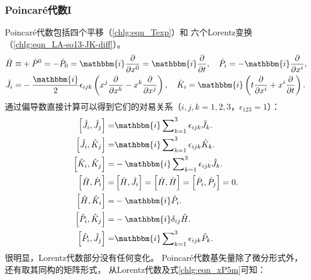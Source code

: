 \subsubsection{Poincar\'{e}代数I}\label{chlg:sec_PA-1}
Poincar\'{e}代数包括四个平移（\eqref{chlg:eqn_Texp}）和
六个Lorentz变换（\eqref{chlg:eqn_LA-so13-JK-diff}）。
\begin{subequations}\label{chlg:eqn_PA-gen}
    \begin{align}
        \hat{H} \equiv& +\hat{P}^0= -\hat{P}_0 = \mathbbm{i}\frac{\partial }{\partial x^0}
        = \mathbbm{i}\frac{\partial }{\partial t }, \quad
        \hat{P}_i = -\mathbbm{i}\frac{\partial }{\partial x^i} ,\\
        \hat{J}_i=& -\frac{\mathbbm{i}}{2}\epsilon_{ijk} \left(x^j\frac{\partial }{\partial x^k}
        - x^k\frac{\partial }{\partial x^j}\right), \quad
        \hat{K}_i= \mathbbm{i} \left(t\frac{\partial }{\partial x^i}+  x^i\frac{\partial }{\partial t}\right) .
    \end{align}
\end{subequations}
通过偏导数直接计算可以得到它们的对易关系（$i,j,k=1,2,3$，$\epsilon_{123}=1$）：
\begin{subequations}\label{chlg:eqn_PA-iso13-comm-PJK}
    \begin{align}
        \left[\hat{J}_i, \hat{J}_j \right] =& \mathbbm{i} \sum\nolimits_{k=1}^{3} \epsilon_{ijk} \hat{J}_k . \\
        \left[\hat{J}_i, \hat{K}_j\right] =& \mathbbm{i} \sum\nolimits_{k=1}^{3} \epsilon_{ijk} \hat{K}_k . \\
        \left[\hat{K}_i, \hat{K}_j\right] =& -\mathbbm{i}\sum\nolimits_{k=1}^{3} \epsilon_{ijk} \hat{J}_k . \\
        \left[\hat{H}, \hat{P}_i \right] =& \left[\hat{H}, \hat{J}_i \right]
        =\left[\hat{H}, \hat{H} \right] =\left[\hat{P}_i, \hat{P}_j \right] =0 . \\
        \left[\hat{H}, \hat{K}_i \right] = & -\mathbbm{i} \hat{P}_i .\\
        \left[\hat{P}_i, \hat{K}_j \right] =& -\mathbbm{i} \delta_{ij} \hat{H} . \\
        \left[\hat{P}_i, \hat{J}_j \right] =& \mathbbm{i} \sum\nolimits_{k=1}^{3} \epsilon_{ijk} \hat{P}_k .
    \end{align}
\end{subequations}
很明显，Lorentz代数部分没有任何变化。
Poincar\'{e}代数基矢量除了微分形式外，还有取其同构的矩阵形式，
从Lorentz代数及式\eqref{chlg:eqn_xP5m}可知：

